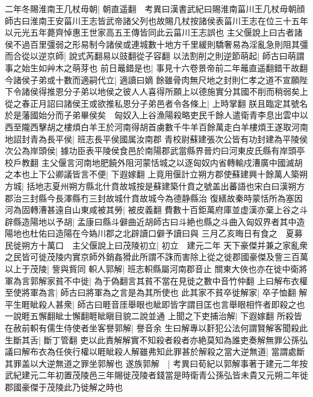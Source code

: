 二年冬賜淮南王几杖毋朝|{
	朝直遥翻　考異曰漢書武紀曰賜淮南菑川王几杖毋朝顔師古曰淮南王安菑川王志皆武帝諸父列也故賜几杖按諸侯表菑川王志在位三十五年以元光五年薨齊悼惠王世家高五王傳皆同此云菑川王志誤也}
主父偃說上曰古者諸侯不過百里彊弱之形易制今諸侯或連城數十地方千里緩則驕奢易為淫亂急則阻其彊而合從以逆京師|{
	說式芮翻易以豉翻從子容翻}
以法割削之則逆節萌起|{
	師古曰萌謂事之始生如艸木之萌芽也}
前日鼂錯是也|{
	事見十六卷景帝前二年鼂直遥翻錯干故翻}
今諸侯子弟或十數而適嗣代立|{
	適讀曰嫡}
餘雖骨肉無尺地之封則仁孝之道不宣願陛下令諸侯得推恩分子弟以地侯之彼人人喜得所願上以德施實分其國不削而稍弱矣上從之春正月詔曰諸侯王或欲推私恩分子弟邑者令各條上|{
	上時掌翻}
朕且臨定其號名於是藩國始分而子弟畢侯矣　匈奴入上谷漁陽殺略吏民千餘人遣衛青李息出雲中以西至隴西擊胡之樓煩白羊王於河南得胡首虜數千牛羊百餘萬走白羊樓煩王遂取河南地詔封青為長平侯|{
	班志長平侯國属汝南郡}
青校尉蘇建張次公皆有功封建為平陵侯次公為岸頭侯|{
	據功臣表平陵侯食邑於南陽郡武當縣界晉灼曰河東皮氏縣有岸頭亭校戶教翻}
主父偃言河南地肥饒外阻河蒙恬城之以逐匈奴内省轉輸戍漕廣中國滅胡之本也上下公卿議皆言不便|{
	下遐嫁翻}
上竟用偃計立朔方郡使蘇建興十餘萬人築朔方城|{
	括地志夏州朔方縣北什賁故城按是蘇建築什賁之號盖出蕃語也宋白曰漢朔方郡治三封縣今長澤縣冇三封故城什賁故城今為德静縣治}
復繕故秦時蒙恬所為塞因河為固轉漕甚遠自山東咸被其勞|{
	被皮義翻}
費數十百鉅萬府庫並虚漢亦棄上谷之斗辟縣造陽地以予胡|{
	孟康曰縣斗僻曲近胡師古曰斗絶也縣之斗曲入匈奴界者其中造陽地也杜佑曰造陽在今媯川郡之北辟讀口僻予讀曰與}
三月乙亥晦日有食之　夏募民徙朔方十萬口　主父偃說上曰茂陵初立|{
	初立　建元二年}
天下豪傑并兼之家亂衆之民皆可徙茂陵内實京師外銷姦猾此所謂不誅而害除上從之徙郡國豪傑及訾三百萬以上于茂陵|{
	訾與貲同}
軹人郭解|{
	班志軹縣屬河南郡音止}
關東大俠也亦在徙中衛將軍為言郭解家貧不中徙|{
	為于偽翻言其貧不當在見徙之數中音竹仲翻}
上曰解布衣權至使將軍為言|{
	師古曰將軍為之言是為其所使也}
此其家不貧卒徙解家|{
	卒子恤翻}
解平生睚眦殺人甚衆|{
	師古曰睚音厓舉眼也眦即皆字謂目匡也言舉眼相忤者即殺之也一說睚五懈翻眦士懈翻睚眦瞋目貌二說並通}
上聞之下吏捕治解|{
	下遐嫁翻}
所殺皆在赦前軹有儒生侍使者坐客譽郭解|{
	譽音余}
生曰解專以姧犯公法何謂賢解客聞殺此生斷其舌|{
	斷丁管翻}
吏以此責解解實不知殺者殺者亦絶莫知為誰吏奏解無罪公孫弘議曰解布衣為任俠行權以睚眦殺人解雖弗知此罪甚於解殺之當大逆無道|{
	當謂處斷其罪盖以大逆無道之罪坐郭解也}
遂族郭解　|{
	考異曰荀紀以郭解事著于建元二年按武紀建元二年初置茂陵邑三年賜徙茂陵者錢當是時衛青公孫弘皆未貴又元朔二年徙郡國豪傑于茂陵此乃徙解之時也}


